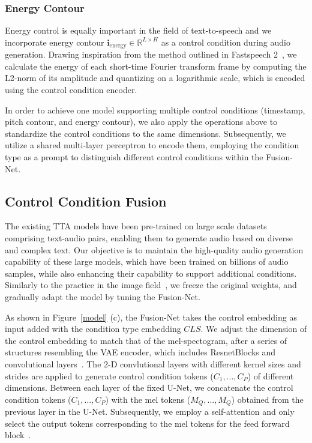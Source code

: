 \documentclass[letterpaper]{article} %
\begin{document}
\subsubsection{Energy Contour} Energy control is equally important in the field of text-to-speech and we incorporate energy contour $\mathbf{i}_{\text{energy}} \in \mathbb{R}^{L \times H}$ as a control condition during audio generation. Drawing inspiration from the method outlined in Fastspeech 2~\cite{ren2021fastspeech2}, we calculate the energy of each short-time Fourier transform frame by computing the L2-norm of its amplitude and quantizing on a logarithmic scale, which is encoded using the control condition encoder.

In order to achieve one model supporting multiple control conditions (timestamp, pitch contour, and energy contour), we also apply the operations above to standardize the control conditions to the same dimensions. Subsequently, we utilize a shared multi-layer perceptron to encode them, employing the condition type as a prompt to distinguish different control conditions within the Fusion-Net.

\subsection{Control Condition Fusion}
\label{control condition fusion}

The existing TTA models have been pre-trained on large scale datasets comprising text-audio pairs, enabling them to generate audio based on diverse and complex text. Our objective is to maintain the high-quality audio generation capability of these large models, which have been trained on billions of audio samples, while also enhancing their capability to support additional conditions. Similarly to the practice in the image field~\cite{zhang2023adding,li2023gligen}, we freeze the original weights, and gradually adapt the model by tuning the Fusion-Net.

As shown in Figure~\ref{model} (c), the Fusion-Net takes the control embedding as input added with the condition type embedding $CLS$. We adjust the dimension of the control embedding to match that of the mel-spectogram, after a series of structures resembling the VAE encoder, which includes ResnetBlocks and convolutional layers~\cite{kingma2013vae}. The 2-D convlutional layers with different kernel sizes and strides are applied to generate control condition tokens ($C_1, ..., C_P$) of different dimensions. Between each layer of the fixed U-Net, we concatenate the control condition tokens ($C_1, ..., C_P$) with the mel tokens ($M_Q, ..., M_Q$) obtained from the previous layer in the U-Net. Subsequently, we employ a self-attention and only select the output tokens corresponding to the mel tokens for the feed forward block~\cite{li2023gligen}. 
\end{document}
